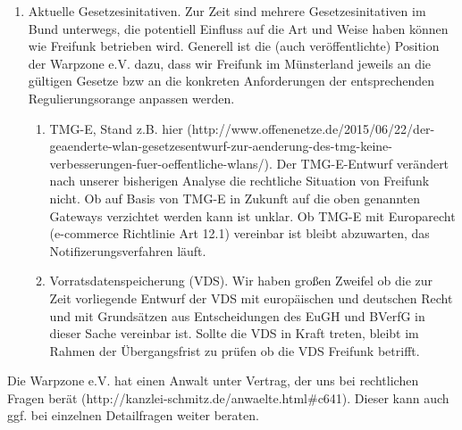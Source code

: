 \documentclass{article}
\begin{document}
\begin{enumerate}
\item Aktuelle Gesetzesinitativen. Zur Zeit sind mehrere Gesetzesinitativen im Bund unterwegs, die potentiell Einfluss auf die Art und Weise haben können wie Freifunk betrieben wird. Generell ist die (auch veröffentlichte) Position der Warpzone e.V. dazu, dass wir Freifunk im Münsterland jeweils an die gültigen Gesetze bzw an die konkreten Anforderungen der entsprechenden Regulierungsorange anpassen werden.
	\begin{enumerate}
		\item TMG-E, Stand z.B. hier (http://www.offenenetze.de/2015/06/22/der-geaenderte-wlan-gesetzesentwurf-zur-aenderung-des-tmg-keine-verbesserungen-fuer-oeffentliche-wlans/). Der TMG-E-Entwurf verändert nach unserer bisherigen Analyse die rechtliche Situation von Freifunk nicht. Ob auf Basis von TMG-E in Zukunft auf die oben genannten Gateways verzichtet werden kann ist unklar. Ob TMG-E mit Europarecht (e-commerce Richtlinie Art 12.1) vereinbar ist bleibt abzuwarten, das Notifizerungsverfahren läuft.
		\item Vorratsdatenspeicherung (VDS). Wir haben großen Zweifel ob die zur Zeit vorliegende Entwurf der VDS mit europäischen und deutschen Recht und mit Grundsätzen aus Entscheidungen des EuGH und BVerfG in dieser Sache vereinbar ist. Sollte die VDS in Kraft treten, bleibt im Rahmen der Übergangsfrist zu prüfen ob die VDS Freifunk betrifft.
	\end{enumerate}
\end{enumerate}

Die Warpzone e.V. hat einen Anwalt unter Vertrag, der uns bei rechtlichen Fragen berät (http://kanzlei-schmitz.de/anwaelte.html\#c641). Dieser kann auch ggf. bei einzelnen Detailfragen weiter beraten.
\end{document}
